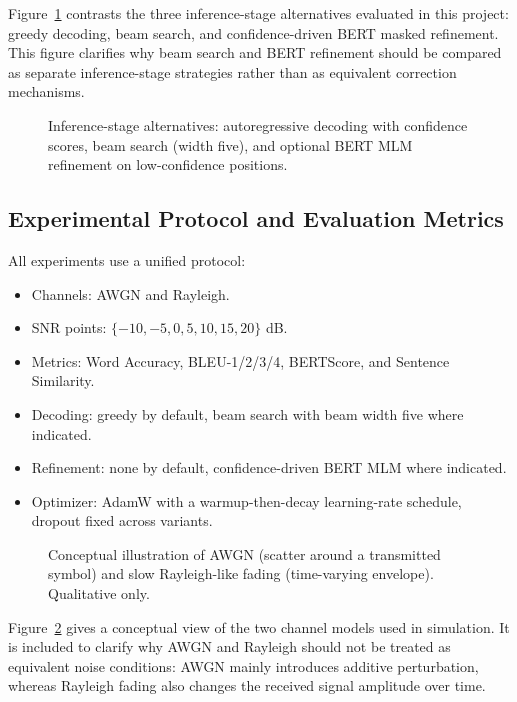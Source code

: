 Figure~\ref{fig:inference_pipeline} contrasts the three inference-stage alternatives evaluated in this project: greedy decoding, beam search, and confidence-driven BERT masked refinement. This figure clarifies why beam search and BERT refinement should be compared as separate inference-stage strategies rather than as equivalent correction mechanisms.
\begin{figure}[!htb]
\centering
{}
\caption{Inference-stage alternatives: autoregressive decoding with confidence scores, beam search (width five), and optional BERT MLM refinement on low-confidence positions.}
\label{fig:inference_pipeline}
\end{figure}
\FloatBarrier

\subsection{Experimental Protocol and Evaluation Metrics}

All experiments use a unified protocol:

\begin{itemize}
    \item Channels: AWGN and Rayleigh.
    \item SNR points: $\{-10,-5,0,5,10,15,20\}$ dB.
    \item Metrics: Word Accuracy, BLEU-1/2/3/4, BERTScore, and Sentence Similarity.
    \item Decoding: greedy by default, beam search with beam width five where indicated.
    \item Refinement: none by default, confidence-driven BERT MLM where indicated.
    \item Optimizer: AdamW \cite{loshchilov2019adamw} with a warmup-then-decay learning-rate schedule, dropout fixed across variants.
\end{itemize}


\begin{figure}[!htb]
\centering
{}
\caption{Conceptual illustration of AWGN (scatter around a transmitted symbol) and slow Rayleigh-like fading (time-varying envelope). Qualitative only.}
\label{fig:channel_models}
\end{figure}
Figure~\ref{fig:channel_models} gives a conceptual view of the two channel models used in simulation. It is included to clarify why AWGN and Rayleigh should not be treated as equivalent noise conditions: AWGN mainly introduces additive perturbation, whereas Rayleigh fading also changes the received signal amplitude over time.


